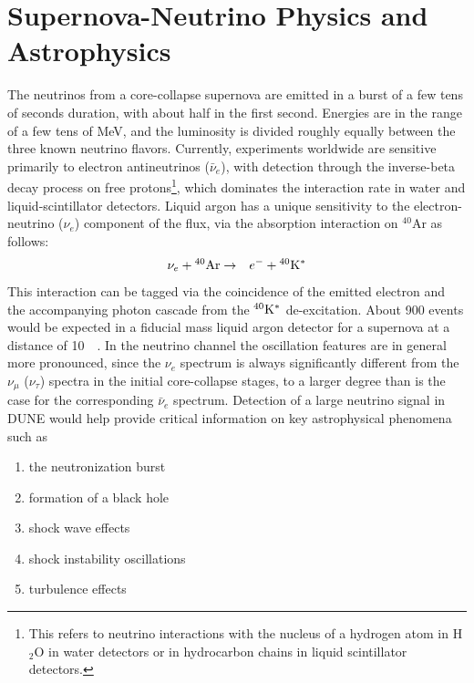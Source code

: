 \section{Supernova-Neutrino Physics and Astrophysics}

The neutrinos from a core-collapse supernova are emitted in a burst of
a few tens of seconds duration, with about half in the first
second. Energies are in the range of a few tens of MeV, and the
luminosity is divided roughly equally between the three known neutrino
flavors.  Currently, experiments worldwide are sensitive primarily to
electron antineutrinos ($\bar{\nu}_e$), with detection through the inverse-beta decay
process on free protons\footnote{This refers to neutrino interactions with the nucleus of a
hydrogen atom in H$_2$O in water detectors or in hydrocarbon chains in 
liquid scintillator detectors.},
 which dominates the interaction rate in water
and liquid-scintillator detectors.  Liquid argon has a unique sensitivity to
the electron-neutrino ($\nu_e$) component of the flux, via the absorption
interaction on $^{40}$Ar as follows:
\begin{eqnarray*}
\nu_e +{}^{40}{\rm Ar} & \rightarrow & e^-+{}^{40}{\rm K^*}
\end{eqnarray*} 
This interaction can be tagged via the coincidence of the emitted
electron and the accompanying photon cascade from the $^{40}{\rm K^*}$
de-excitation.  About 900 events would be expected in a 
fiducial mass liquid argon detector for a supernova at a distance of
\SI{10}{\kilo\parsec}.  In the neutrino channel the oscillation
features are in general more pronounced, since the $\nu_e$ spectrum is
always significantly different from the $\nu_\mu$ ($\nu_\tau$) spectra
in the initial core-collapse stages, to a larger degree than is the
case for the corresponding $\bar{\nu}_e$ spectrum.  Detection of a large
neutrino signal in DUNE would help provide critical information on key
astrophysical phenomena such as
\begin{enumerate}
\item the neutronization burst
\item formation of a black hole
\item shock wave effects
\item shock instability oscillations
\item turbulence effects
\end{enumerate}


